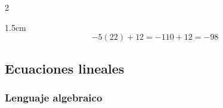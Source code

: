 \documentclass[12pt,examen,answers]{repaso_layout}
\begin{document}
\begin{questions}
{\begin{multicols}{2}
\begin{parts}
                \begin{solutionbox}{1.5cm}
                    \[-5(22)+12=-110+12=-98\]
                \end{solutionbox}
            \end{parts}
        \end{multicols}
    }

    \subsection  {Ecuaciones lineales}
     \subsubsection{Lenguaje algebraico}




\end{questions}
\end{document}
